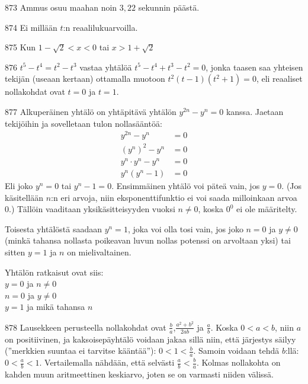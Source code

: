 \begin{Vastaus}{873}
	Ammus osuu maahan noin $3,22$ sekunnin päästä. %
	
\end{Vastaus}
\begin{Vastaus}{874}
Ei millään $t$:n reaalilukuarvoilla.
	
\end{Vastaus}
\begin{Vastaus}{875}
	Kun $1-\sqrt{2}<x<0$ tai $x>1+\sqrt{2}$
	
\end{Vastaus}
\begin{Vastaus}{876}
$t^5-t^4=t^2-t^3$ vastaa yhtälöä $t^5-t^4+t^3-t^2=0$, jonka taasen saa yhteisen tekijän (useaan kertaan) ottamalla muotoon $t^2(t-1)(t^2+1)=0$, eli reaaliset nollakohdat ovat $t=0$ ja $t=1$.
	
\end{Vastaus}
\begin{Vastaus}{877}
Alkuperäinen yhtälö on yhtäpitävä yhtälön $y^{2n}-y^n=0$ kanssa. Jaetaan tekijöihin ja sovelletaan tulon nollasääntöä:
	\begin{align*}
	y^{2n}-y^n&=0 \\
	(y^n)^2-y^n&=0 \\
	y^n \cdot y^n-y^n&=0 \\
	y^n(y^n-1)&=0
	\end{align*}
Eli joko $y^n=0$ tai $y^n-1=0$.	 Ensimmäinen yhtälö voi päteä vain, jos $y=0$. (Jos käsitellään $n$:n eri arvoja, niin eksponenttifunktio ei voi saada milloinkaan arvoa $0$.) Tällöin vaaditaan yksikäsitteisyyden vuoksi $n\neq0$, koska $0^0$ ei ole määritelty.

Toisesta yhtälöstä saadaan $y^n=1$, joka voi olla tosi vain, jos joko $n=0$ ja $y \neq 0$ (minkä tahansa nollasta poikeavan luvun nollas potenssi on arvoltaan yksi) tai sitten $y=1$ ja $n$ on mielivaltainen.

Yhtälön ratkaisut ovat siis: \\
$y=0$ ja $n \neq 0$ \\
$n=0$ ja $y \neq 0$ \\
$y=1$ ja mikä tahansa $n$
	
\end{Vastaus}
\begin{Vastaus}{878}
Lausekkeen perusteella nollakohdat ovat $\frac{b}{a}$,$\frac{a^2+b^2}{2ab}$ ja $\frac{a}{b}$. Koska $0<a<b$, niin $a$ on positiivinen, ja kaksoisepäyhtälö voidaan jakaa sillä niin, että järjestys säilyy (''merkkien suuntaa ei tarvitse kääntää''): $0<1<\frac{b}{a}$. Samoin voidaan tehdä $b$:llä: $0<\frac{a}{b}<1$. Vertailemalla nähdään, että selvästi $\frac{a}{b}<\frac{b}{a}$. Kolmas nollakohta on kahden muun aritmeettinen keskiarvo, joten se on varmasti niiden välissä.
		
\end{Vastaus}
